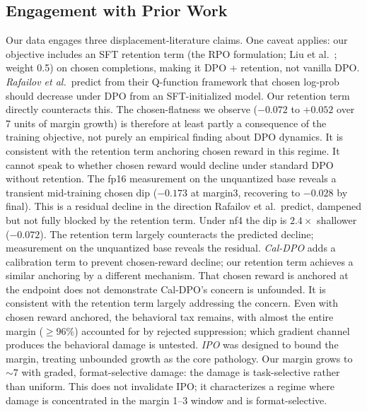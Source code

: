 \documentclass{article}
\begin{document}
\subsection{Engagement with Prior Work}
\label{sec:priorwork}
Our data engages three displacement-literature claims. One caveat applies: our objective includes an SFT retention term (the RPO formulation; Liu et al.\ \citep{liu2024rpo}; weight 0.5) on chosen completions, making it DPO $+$ retention, not vanilla DPO. \emph{Rafailov et al.}\ predict from their Q-function framework that chosen log-prob should decrease under DPO from an SFT-initialized model. Our retention term directly counteracts this. The chosen-flatness we observe ($-0.072$ to $+0.052$ over 7 units of margin growth) is therefore at least partly a consequence of the training objective, not purely an empirical finding about DPO dynamics. It is consistent with the retention term anchoring chosen reward in this regime. It cannot speak to whether chosen reward would decline under standard DPO without retention. The fp16 measurement on the unquantized base reveals a transient mid-training chosen dip ($-0.173$ at margin3, recovering to $-0.028$ by final). This is a residual decline in the direction Rafailov et al.\ predict, dampened but not fully blocked by the retention term. Under nf4 the dip is $2.4\times$ shallower ($-0.072$). The retention term largely counteracts the predicted decline; measurement on the unquantized base reveals the residual. \emph{Cal-DPO} adds a calibration term to prevent chosen-reward decline; our retention term achieves a similar anchoring by a different mechanism. That chosen reward is anchored at the endpoint does not demonstrate Cal-DPO's concern is unfounded. It is consistent with the retention term largely addressing the concern. Even with chosen reward anchored, the behavioral tax remains, with almost the entire margin (${\geq}96\%$) accounted for by rejected suppression; which gradient channel produces the behavioral damage is untested. \emph{IPO} was designed to bound the margin, treating unbounded growth as the core pathology. Our margin grows to ${\sim}7$ with graded, format-selective damage: the damage is task-selective rather than uniform. This does not invalidate IPO; it characterizes a regime where damage is concentrated in the margin 1--3 window and is format-selective.
\end{document}
